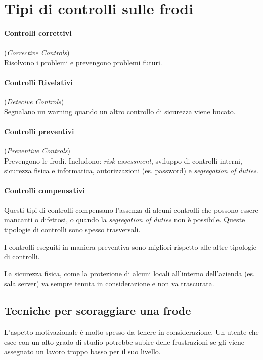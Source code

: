 \section{Tipi di controlli sulle frodi}


\paragraph*{Controlli correttivi} (\textit{Corrective Controls})\\
Risolvono i problemi e prevengono problemi futuri.

\paragraph*{Controlli Rivelativi} (\textit{Detecive Controls})\\
Segnalano un warning quando un altro controllo di sicurezza viene bucato.

\paragraph*{Controlli preventivi} (\textit{Preventive Controls})\\
Prevengono le frodi. Includono: \textit{risk assessment}, sviluppo di controlli
interni, sicurezza fisica e informatica, autorizzazioni (es. password) e
\textit{segregation of duties}.

\paragraph*{Controlli compensativi}
Questi tipi di controlli compensano l'assenza di alcuni controlli che possono
essere mancanti o difettosi, o quando la \textit{segregation of duties} non è
possibile. Queste tipologie di controlli sono spesso trasversali.

\par I controlli eseguiti in maniera preventiva sono migliori rispetto alle
altre tipologie di controlli.

La sicurezza fisica, come la protezione di alcuni locali all'interno
dell'azienda (es. sala server) va sempre tenuta in
considerazione e non va trascurata.

\subsection{Tecniche per scoraggiare una frode}

L'aspetto motivazionale è molto spesso da tenere in considerazione.
Un utente che esce con un alto grado di studio potrebbe subire delle
frustrazioni se gli viene assegnato un lavoro troppo basso per il suo livello.

